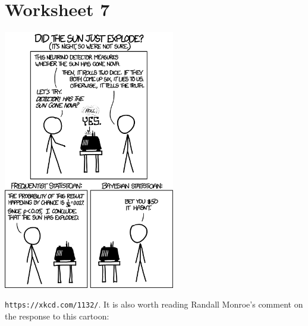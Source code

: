 \documentclass[11pt,a4paper]{scrartcl}
\begin{document}
\section*{Worksheet 7}


\begin{center}
\includegraphics[width=7.5cm]{frequentists_vs_bayesians.png}
\end{center}
\texttt{https://xkcd.com/1132/}. It is also worth reading Randall Monroe's comment on the response to this cartoon:
\end{document}
